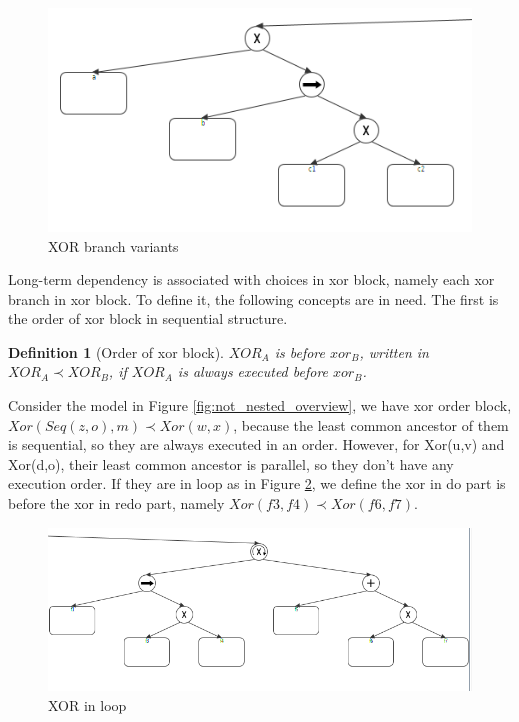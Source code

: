 \documentclass[]{article}
\newtheorem{mydef}{Definition}[section]
\begin{document}
\begin{figure}[h!]
	\includegraphics[width=\textwidth]{PT02_xor_nested_and_pure.png}
	\caption{XOR branch variants}
	\label{fig:xor_nested_branch_variants}
\end{figure}
Long-term dependency is associated with choices in xor block, namely each xor branch in xor block. To define it, the following concepts are in need. The first is the order of xor block in sequential structure.
\begin{mydef}[Order of xor block]
	$XOR_A$ is before $xor_B$, written in $XOR_A \prec XOR_B$, if $XOR_A$ is always executed before $xor_B$.  %
\end{mydef}
Consider the model in Figure \ref{fig:not_nested_overview}, we have xor order block, $Xor(Seq(z,o),m) \prec Xor(w,x)$, because the least common ancestor of them is sequential, so they are always executed in an order. However, for Xor(u,v) and Xor(d,o), their least common ancestor is parallel, so they don't have any execution order. If they are in loop as in Figure \ref{fig:xor_in_loop}, we define the xor in do part is before the xor in redo part, namely $Xor(f3,f4) \prec Xor(f6,f7)$.
\begin{figure}[h!]
	\includegraphics[width=\textwidth]{PT03_xor_in_loop.png}
	\caption{XOR in loop}
	\label{fig:xor_in_loop}
\end{figure}
\end{document}
